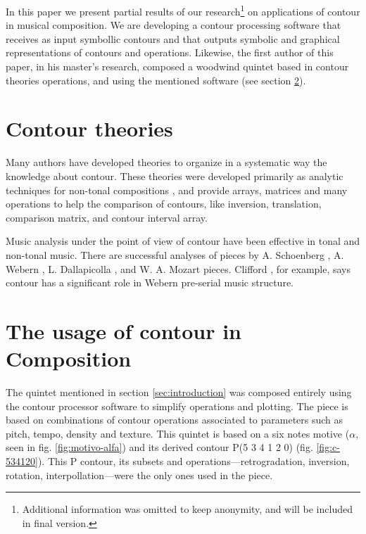 In this paper we present partial results of our
research\footnote{Additional information was omitted to keep
  anonymity, and will be included in final version.} on applications
of contour in musical composition. We are developing a contour
processing software that receives as input symbollic contours and that
outputs symbolic and graphical representations of contours and
operations. Likewise, the first author of this paper, in his master's
research, composed a woodwind quintet based in contour theories
operations, and using the mentioned software (see section
\ref{sec:contour-composition}).

\section{Contour theories}
\label{sec:contour-theories}

Many authors
\cite{friedmann85:methodology,friedmann87:response,morris87:composition,morris93:directions,marvin.ea87:relating,marvin88:generalized,marvin.ea95:generalization,polansky.ea92:possible,quinn97:fuzzy,clifford95:contour,beard03:contour}
have developed theories to organize in a systematic way the knowledge
about contour. These theories were developed primarily as analytic
techniques for non-tonal compositions \cite{beard03:contour}, and
provide arrays, matrices and many operations to help the comparison of
contours, like inversion, translation, comparison matrix, and contour
interval array.

Music analysis under the point of view of contour have been effective
in tonal and non-tonal music. There are successful analyses of pieces
by A. Schoenberg \cite{friedmann85:methodology}, A. Webern
\cite{clifford95:contour}, L. Dallapicolla
\cite{marvin88:generalized}, and W. A. Mozart \cite{beard03:contour}
pieces. Clifford \cite{clifford95:contour}, for example, says contour
has a significant role in Webern pre-serial music structure.

\section{The usage of contour in Composition}
\label{sec:contour-composition}

The quintet mentioned in section \ref{sec:introduction} was composed
entirely using the contour processor software to simplify operations
and plotting. The piece is based on combinations of contour operations
associated to parameters such as pitch, tempo, density and
texture. This quintet is based on a six notes motive ($\alpha$, seen
in fig. \ref{fig:motivo-alfa}) and its derived contour P(5 3 4 1 2 0)
(fig. \ref{fig:c-534120}). This P contour, its subsets and
operations---retrogradation, inversion, rotation,
interpollation---were the only ones used in the piece.

